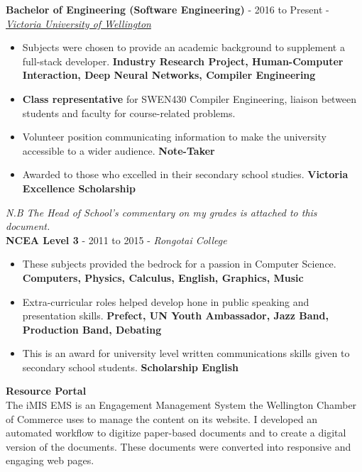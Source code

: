 \documentclass[9pt]{developercv}
\begin{document}

\textbf{Bachelor of Engineering (Software Engineering)} - 2016 to Present - \emph{\href{https://www.wgtn.ac.nz/}{Victoria University of Wellington}}
\begin{itemize}
    \item Subjects were chosen to provide an academic background to supplement a full-stack developer. \textbf{Industry Research Project, Human-Computer Interaction, Deep Neural Networks, Compiler Engineering}
    \item \textbf{Class representative} for SWEN430 Compiler Engineering, liaison between students and faculty for course-related problems. 
    \item Volunteer position communicating information to make the university accessible to a wider audience. \textbf{Note-Taker}
    \item Awarded to those who excelled in their secondary school studies. \textbf{Victoria Excellence Scholarship}
\end{itemize}
\emph{N.B The Head of School's commentary on my grades is attached to this document.} \\

\textbf{NCEA Level 3} - 2011 to 2015 - \emph{Rongotai College}
\begin{itemize}
    \item These subjects provided the bedrock for a passion in Computer Science. \textbf{Computers, Physics, Calculus, English, Graphics, Music}
    \item Extra-curricular roles helped develop hone in public speaking and presentation skills. \textbf{Prefect, UN Youth Ambassador, Jazz Band, Production Band, Debating}
    \item This is an award for university level written communications skills given to secondary school students. \textbf{Scholarship English}
\end{itemize}



\textbf{Resource Portal} \\
The iMIS EMS is an Engagement Management System the Wellington Chamber of Commerce uses to manage the content on its website. I developed an automated workflow to digitize paper-based documents and to create a digital version of the documents. These documents were converted into responsive and engaging web pages. \\
\end{document}
